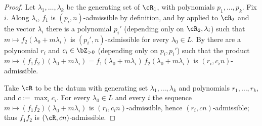 \documentclass[12pt,a4paper]{amsart}%
\begin{document}
  \begin{proof}
 Let $\lambda_1,\dots,\lambda_k$ be the generating set of $\cR_1$, with polynomials $p_1,\dots,p_k$. Fix $i$. Along $\lambda_i$, $f_1$ is $(p_i,n)$-admissible by definition, and by  applied to $\cR_2$ and the vector $\lambda_i$ there is a polynomial $p_i'$ (depending only on $\cR_2,\lambda_i$) such that $m\mapsto f_2(\lambda_0+m\lambda_i)$ is $(p_i',n)$-admissible for every $\lambda_0\in L$. By  there are a polynomial $r_i$ and $c_i\in\Z_{>0}$ (depending only on $p_i,p_i'$) such that the product $m\mapsto(f_1f_2)(\lambda_0+m\lambda_i)=f_1(\lambda_0+m\lambda_i)\,f_2(\lambda_0+m\lambda_i)$ is $(r_i,c_in)$-admissible.

 Take $\cR$ to be the datum with generating set $\lambda_1,\dots,\lambda_k$ and polynomials $r_1,\dots,r_k$, and $c:=\max_i c_i$. For every $\lambda_0\in L$ and every $i$ the sequence $m\mapsto(f_1f_2)(\lambda_0+m\lambda_i)$ is $(r_i,c_in)$-admissible, hence $(r_i,cn)$-admissible; thus $f_1f_2$ is $(\cR,cn)$-admissible.
 \end{proof}
\end{document}

